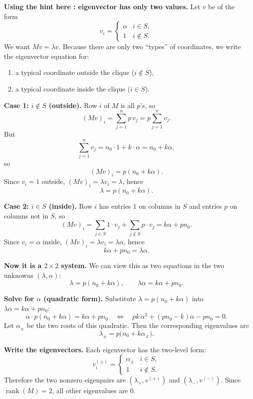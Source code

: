\documentclass[10pt]{article}
\DeclareMathOperator{\rank}{rank}
\begin{document}
\medskip
\textbf{Using the hint here : eigenvector has only two values.}
Let $v$ be of the form
\[
v_i=
\begin{cases}
\alpha & i\in S,\\
1 & i\notin S.
\end{cases}
\]
We want $Mv=\lambda v$. Because there are only two ``types'' of coordinates, we write the eigenvector equation for:
\begin{enumerate}
\item a typical coordinate outside the clique ($i\notin S$),
\item a typical coordinate inside the clique ($i\in S$).
\end{enumerate}

\medskip
\textbf{Case 1: $i\notin S$ (outside).}
Row $i$ of $M$ is all $p$'s, so
\[
(Mv)_i = \sum_{j=1}^n p\,v_j = p\sum_{j=1}^n v_j.
\]
But
\[
\sum_{j=1}^n v_j = n_0\cdot 1 + k\cdot \alpha = n_0+k\alpha,
\]
so
\[
(Mv)_i = p(n_0+k\alpha).
\]
Since $v_i=1$ outside, $(Mv)_i=\lambda v_i=\lambda$, hence
\[
\boxed{\lambda = p(n_0+k\alpha).}
\]

\medskip
\textbf{Case 2: $i\in S$ (inside).}
Row $i$ has entries $1$ on columns in $S$ and entries $p$ on columns not in $S$, so
\[
(Mv)_i
=
\sum_{j\in S} 1\cdot v_j + \sum_{j\notin S} p\cdot v_j
=
k\alpha + pn_0.
\]
Since $v_i=\alpha$ inside, $(Mv)_i=\lambda v_i=\lambda\alpha$, hence
\[
\boxed{k\alpha + pn_0 = \lambda\alpha.}
\]

\medskip
\textbf{Now it is a $2\times 2$ system.}
We can view this as two equations in the two unknowns $(\lambda,\alpha)$:
\[
\lambda = p(n_0+k\alpha),
\qquad
\lambda\alpha = k\alpha + pn_0.
\]

\medskip
\textbf{Solve for $\alpha$ (quadratic form).}
Substitute $\lambda=p(n_0+k\alpha)$ into $\lambda\alpha=k\alpha+pn_0$:
\[
\alpha\cdot p(n_0+k\alpha)=k\alpha+pn_0
\quad\Longleftrightarrow\quad
pk\,\alpha^2 + (pn_0-k)\alpha - pn_0 = 0.
\]
Let $\alpha_\pm$ be the two roots of this quadratic. Then the corresponding eigenvalues are
\[
\boxed{\lambda_{\pm}=p\big(n_0+k\alpha_{\pm}\big).}
\]

\medskip
\textbf{Write the eigenvectors.}
Each eigenvector has the two-level form:
\[
v^{(\pm)}_i=
\begin{cases}
\alpha_{\pm} & i\in S,\\
1 & i\notin S.
\end{cases}
\]
Therefore the two nonzero eigenpairs are $(\lambda_+,v^{(+)})$ and $(\lambda_-,v^{(-)})$.
Since $\rank(M)=2$, all other eigenvalues are $0$.
\end{document}
